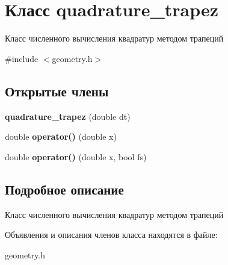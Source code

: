 \hypertarget{classquadrature__trapez}{}\section{Класс quadrature\+\_\+trapez}
\label{classquadrature__trapez}


Класс численного вычисления квадратур методом трапеций  




{\ttfamily \#include $<$geometry.\+h$>$}

\subsection*{Открытые члены}
\begin{DoxyCompactItemize}
\item 
\mbox{\label{classquadrature__trapez_ae0ccaaa6f535addd5e2f590288905be6}} 
{\bfseries quadrature\+\_\+trapez} (double dt)
\item 
\mbox{\label{classquadrature__trapez_a53e90bc96e1e4e2522f9d462287f9cee}} 
double {\bfseries operator()} (double x)
\item 
\mbox{\label{classquadrature__trapez_ab3fb522d3ce115635fe560e86bb7ae20}} 
double {\bfseries operator()} (double x, bool fs)
\end{DoxyCompactItemize}


\subsection{Подробное описание}
Класс численного вычисления квадратур методом трапеций 

Объявления и описания членов класса находятся в файле\+:\begin{DoxyCompactItemize}
\item 
geometry.\+h\end{DoxyCompactItemize}

